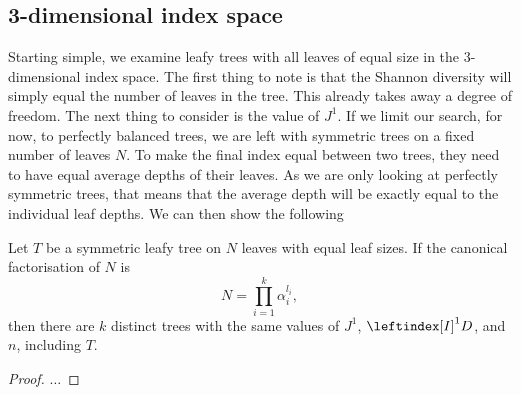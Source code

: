 \subsection{3-dimensional index space}
Starting simple, we examine leafy trees with all leaves of equal size in the $3$-dimensional index space. The first thing to note is that the Shannon diversity will simply equal the number of leaves in the tree. This already takes away a degree of freedom. The next thing to consider is the value of $J^1$. If we limit our search, for now, to perfectly balanced trees, we are left with symmetric trees on a fixed number of leaves $N$. To make the final index equal between two trees, they need to have equal average depths of their leaves. As we are only looking at perfectly symmetric trees, that means that the average depth will be exactly equal to the individual leaf depths. We can then show the following
\begin{proposition}
    Let $T$ be a symmetric leafy tree on $N$ leaves with equal leaf sizes. If the canonical factorisation of $N$ is
    \begin{equation}
        N = \prod_{i=1}^k \alpha_i^{l_i},
    \end{equation}
then there are $k$ distinct trees with the same values of $J^1$, $\leftindex[I]^1{D}$, and $n$, including $T$.
\end{proposition}
\begin{proof}
    $\dots$
\end{proof}

